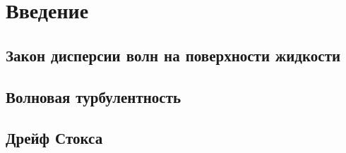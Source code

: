 \chapter{Введение} \label{chapt1}

\section{Закон дисперсии волн на поверхности жидкости} \label{sect1_1}

\section{Волновая турбулентность} \label{sect1_2}

\section{Дрейф Стокса} \label{sect1_3}


\clearpage